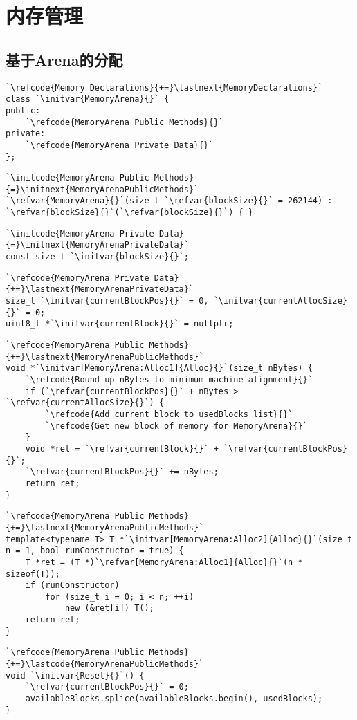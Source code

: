 \section{内存管理}\label{sec:内存管理}

\subsection{基于Arena的分配}\label{sub:基于Arena的分配}
\begin{lstlisting}
`\refcode{Memory Declarations}{+=}\lastnext{MemoryDeclarations}`
class `\initvar{MemoryArena}{}` {
public:
    `\refcode{MemoryArena Public Methods}{}`
private:
    `\refcode{MemoryArena Private Data}{}`
};
\end{lstlisting}

\begin{lstlisting}
`\initcode{MemoryArena Public Methods}{=}\initnext{MemoryArenaPublicMethods}`
`\refvar{MemoryArena}{}`(size_t `\refvar{blockSize}{}` = 262144) : `\refvar{blockSize}{}`(`\refvar{blockSize}{}`) { }
\end{lstlisting}

\begin{lstlisting}
`\initcode{MemoryArena Private Data}{=}\initnext{MemoryArenaPrivateData}`
const size_t `\initvar{blockSize}{}`;
\end{lstlisting}

\begin{lstlisting}
`\refcode{MemoryArena Private Data}{+=}\lastnext{MemoryArenaPrivateData}`
size_t `\initvar{currentBlockPos}{}` = 0, `\initvar{currentAllocSize}{}` = 0;
uint8_t *`\initvar{currentBlock}{}` = nullptr;
\end{lstlisting}

\begin{lstlisting}
`\refcode{MemoryArena Public Methods}{+=}\lastnext{MemoryArenaPublicMethods}`
void *`\initvar[MemoryArena:Alloc1]{Alloc}{}`(size_t nBytes) {
    `\refcode{Round up nBytes to minimum machine alignment}{}`
    if (`\refvar{currentBlockPos}{}` + nBytes > `\refvar{currentAllocSize}{}`) {
        `\refcode{Add current block to usedBlocks list}{}`
        `\refcode{Get new block of memory for MemoryArena}{}`
    }
    void *ret = `\refvar{currentBlock}{}` + `\refvar{currentBlockPos}{}`;
    `\refvar{currentBlockPos}{}` += nBytes;
    return ret;
}
\end{lstlisting}

\begin{lstlisting}
`\refcode{MemoryArena Public Methods}{+=}\lastnext{MemoryArenaPublicMethods}`
template<typename T> T *`\initvar[MemoryArena:Alloc2]{Alloc}{}`(size_t n = 1, bool runConstructor = true) {
    T *ret = (T *)`\refvar[MemoryArena:Alloc1]{Alloc}{}`(n * sizeof(T));
    if (runConstructor)
        for (size_t i = 0; i < n; ++i)
            new (&ret[i]) T();
    return ret;
}
\end{lstlisting}

\begin{lstlisting}
`\refcode{MemoryArena Public Methods}{+=}\lastcode{MemoryArenaPublicMethods}`
void `\initvar{Reset}{}`() {
    `\refvar{currentBlockPos}{}` = 0;
    availableBlocks.splice(availableBlocks.begin(), usedBlocks);
}
\end{lstlisting}